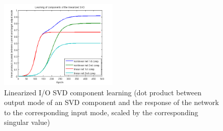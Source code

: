 \documentclass[10pt,letterpaper]{article}
\begin{document}
\begin{figure}
\includegraphics[width=0.5\textwidth]{figures/linearized_SVD_component_learning.png}
\caption{Linearized I/O SVD component learning (dot product between output mode of an SVD component and the response of the network to the corresponding input mode, scaled by the corresponding singular value)}
\label{linearized_SVD_component_learning}
\end{figure}
\end{document}
